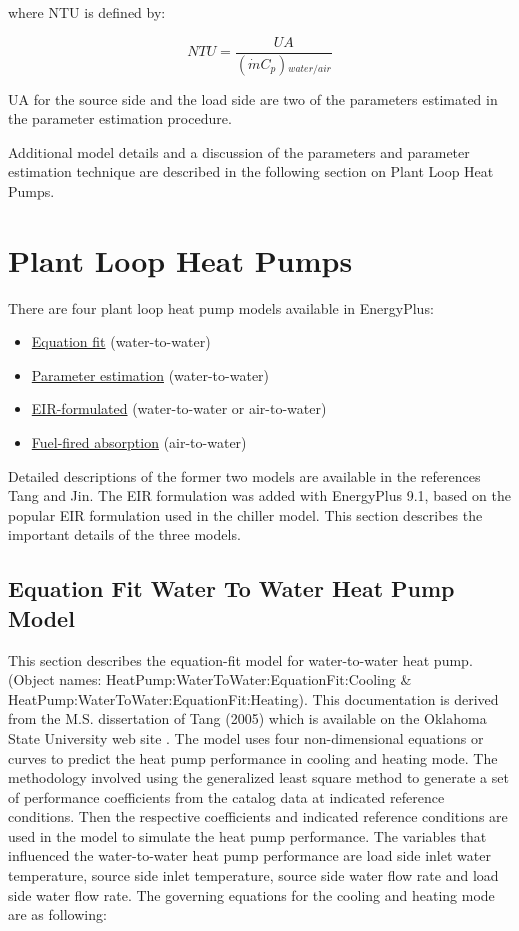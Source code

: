 where NTU is defined by:

\begin{equation}
NTU = \frac{{UA}}{{(\dot mC{}_p){}_{water/air}}}
\end{equation}

UA for the source side and the load side are two of the parameters estimated in the parameter estimation procedure.

Additional model details and a discussion of the parameters and parameter estimation technique are described in the following section on Plant Loop Heat Pumps.

\section{Plant Loop Heat Pumps}\label{plant-loop-heat-pumps}

There are four plant loop heat pump models available in EnergyPlus:

\begin{itemize}
  \item \hyperref[equation-fit-water-to-water-heat-pump-model]{Equation fit} (water-to-water)
  \item \hyperref[parameter-estimation-water-to-water-heat-pump-model]{Parameter estimation} (water-to-water)
  \item \hyperref[eir-plant-loop-heat-pump-model]{EIR-formulated} (water-to-water or air-to-water)
  \item \hyperref[fuel-fired-air-to-water-heat-pumps]{Fuel-fired absorption} (air-to-water)
\end{itemize}

Detailed descriptions of the former two models are available in the references Tang and Jin.  The EIR formulation was added with EnergyPlus 9.1, based on the popular EIR formulation used in the chiller model.  This section describes the important details of the three models.

\subsection{Equation Fit Water To Water Heat Pump Model}\label{equation-fit-water-to-water-heat-pump-model}

This section describes the equation-fit model for water-to-water heat pump. (Object names: HeatPump:WaterToWater:EquationFit:Cooling \& HeatPump:WaterToWater:EquationFit:Heating). This documentation is derived from the M.S. dissertation of Tang (2005) which is available on the Oklahoma State University web site . The model uses four non-dimensional equations or curves to predict the heat pump performance in cooling and heating mode. The methodology involved using the generalized least square method to generate a set of performance coefficients from the catalog data at indicated reference conditions. Then the respective coefficients and indicated reference conditions are used in the model to simulate the heat pump performance. The variables that influenced the water-to-water heat pump performance are load side inlet water temperature, source side inlet temperature, source side water flow rate and load side water flow rate. The governing equations for the cooling and heating mode are as following:

